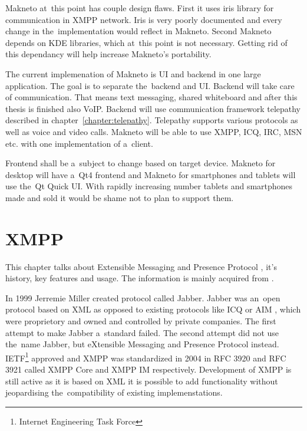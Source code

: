 Makneto at~this point has couple design flaws. First it uses iris library for communication in XMPP network. Iris is very poorly documented and every change in the~implementation would reflect in Makneto. Second Makneto depends on KDE libraries, which at~this point is not necessary. Getting rid of this dependancy will help increase Makneto's portability. 

The current implemenation of Makneto is UI and backend in one large application. The goal is to separate the~backend and UI. Backend will take care of communication. That means text messaging, shared whiteboard and after this thesis is finished also VoIP. Backend will use communication framework telepathy described in chapter~\ref{chapter:telepathy}. Telepathy supports various protocols as well as voice and video calls. Makneto will be able to use XMPP, ICQ, IRC, MSN etc. with one implementation of a~client.

Frontend shall be a~subject to change based on target device. Makneto for desktop will have a~Qt4 frontend and Makneto for smartphones and tablets will use the~Qt Quick UI. With rapidly increasing number tablets and smartphones made and sold it would be shame not to plan to support them.  




\chapter{XMPP}\label{chapter:xmpp}
This chapter talks about Extensible Messaging and Presence Protocol \cite{xmpp}, it's history, key features and usage. The information is mainly acquired from \cite{xmppBook,xmppCoreRFC,xmppIMRFC}.

In 1999 Jerremie Miller created protocol called Jabber. Jabber was an~open protocol based on XML as opposed to existing protocols like ICQ \cite{ICQ} or AIM \cite{AIM}, which were proprietory and owned and controlled by private companies. The first attempt to make Jabber a~standard failed. The second attempt did not use the~name Jabber, but eXtensible Messaging and Presence Protocol instead. IETF\footnote{Internet Engineering Task Force} approved and XMPP was standardized in 2004 in RFC 3920 and RFC 3921 called XMPP Core and XMPP IM respectively. Development of XMPP is still active as it is based on XML it is possible to add functionality without jeopardising the~compatibility of existing implemenstations.      

